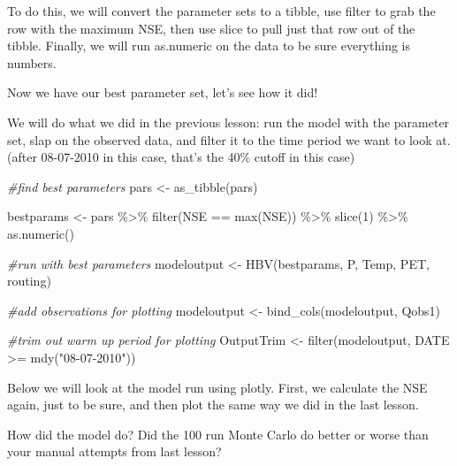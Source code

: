 \documentclass[
]{book}
\newenvironment{Shaded}{\begin{snugshade}}{\end{snugshade}}
\newcommand{\CommentTok}[1]{\textcolor[rgb]{0.56,0.35,0.01}{\textit{#1}}}
\newcommand{\DecValTok}[1]{\textcolor[rgb]{0.00,0.00,0.81}{#1}}
\newcommand{\FunctionTok}[1]{\textcolor[rgb]{0.00,0.00,0.00}{#1}}
\newcommand{\NormalTok}[1]{#1}
\newcommand{\OtherTok}[1]{\textcolor[rgb]{0.56,0.35,0.01}{#1}}
\newcommand{\SpecialCharTok}[1]{\textcolor[rgb]{0.00,0.00,0.00}{#1}}
\newcommand{\StringTok}[1]{\textcolor[rgb]{0.31,0.60,0.02}{#1}}
\begin{document}
To do this, we will convert the parameter sets to a tibble, use filter to grab the row with the maximum NSE, then use slice to pull just that row out of the tibble. Finally, we will run as.numeric on the data to be sure everything is numbers.

Now we have our best parameter set, let's see how it did!

We will do what we did in the previous lesson: run the model with the parameter set, slap on the observed data, and filter it to the time period we want to look at. (after 08-07-2010 in this case, that's the 40\% cutoff in this case)

\begin{Shaded}
\begin{Highlighting}[]
\CommentTok{\#find best parameters}
\NormalTok{pars }\OtherTok{\textless{}{-}} \FunctionTok{as\_tibble}\NormalTok{(pars)}

\NormalTok{bestparams }\OtherTok{\textless{}{-}}\NormalTok{ pars }\SpecialCharTok{\%\textgreater{}\%} \FunctionTok{filter}\NormalTok{(NSE }\SpecialCharTok{==} \FunctionTok{max}\NormalTok{(NSE)) }\SpecialCharTok{\%\textgreater{}\%}
                        \FunctionTok{slice}\NormalTok{(}\DecValTok{1}\NormalTok{) }\SpecialCharTok{\%\textgreater{}\%}
                        \FunctionTok{as.numeric}\NormalTok{()}

\CommentTok{\#run with best parameters}
\NormalTok{modeloutput }\OtherTok{\textless{}{-}}  \FunctionTok{HBV}\NormalTok{(bestparams, P, Temp, PET, routing)}

\CommentTok{\#add observations for plotting}
\NormalTok{modeloutput }\OtherTok{\textless{}{-}} \FunctionTok{bind\_cols}\NormalTok{(modeloutput, Qobs1)}

\CommentTok{\#trim out warm up period for plotting}
\NormalTok{OutputTrim }\OtherTok{\textless{}{-}} \FunctionTok{filter}\NormalTok{(modeloutput, DATE }\SpecialCharTok{\textgreater{}=} \FunctionTok{mdy}\NormalTok{(}\StringTok{"08{-}07{-}2010"}\NormalTok{))}
\end{Highlighting}
\end{Shaded}

Below we will look at the model run using plotly. First, we calculate the NSE again, just to be sure, and then plot the same way we did in the last lesson.

How did the model do? Did the 100 run Monte Carlo do better or worse than your manual attempts from last lesson?
\end{document}
